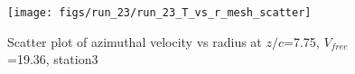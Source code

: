 \begin{figure}[H]
\centering
\texttt{[image: figs/run\_23/run\_23\_T\_vs\_r\_mesh\_scatter]}
\caption{Scatter plot of azimuthal velocity vs radius at $z/c$=7.75, $V_{free}$=19.36, station3}
\label{fig:run_23_T_vs_r_mesh_scatter}
\end{figure}


